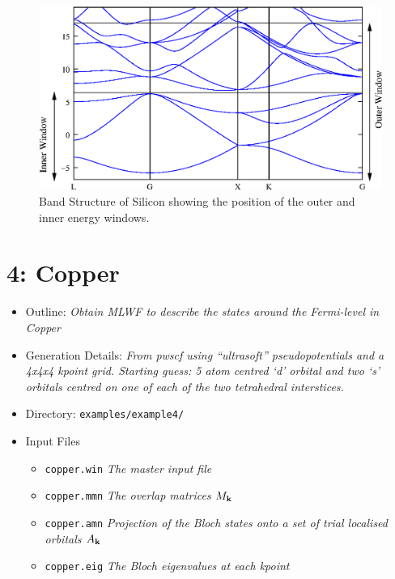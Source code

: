\documentclass[a4paper,11pt,twoside]{article}
\begin{document}
\begin{figure}[h]
\begin{center}
\includegraphics{si.eps}
\caption{Band Structure of Silicon showing the position of the outer and inner energy windows.}
\label{fig:si.bnd}
\end{center}
\end{figure}

\cleardoublepage


\section*{4: Copper}

\begin{itemize}
\item{Outline: \it{Obtain MLWF to describe the states around the Fermi-level in Copper}}
\item{Generation Details: \it{From pwscf using ``ultrasoft'' pseudopotentials
and a 4x4x4 kpoint grid. Starting guess: 5 atom centred `d' orbital and two `s' orbitals centred on 
one of each of the two tetrahedral interstices.}}
\item{Directory: {\tt examples/example4/}}
\item{Input Files}
\begin{itemize}
\item{ {\tt copper.win}  {\it The master input file}}
\item{ {\tt copper.mmn}  {\it The overlap matrices $M_{{\bf k}}$}}
\item{ {\tt copper.amn}  {\it Projection of the Bloch states onto a set of trial localised orbitals $A_{{\bf k}}$}}
\item{ {\tt copper.eig}  {\it The Bloch eigenvalues at each kpoint}}
\end{itemize}

\end{itemize}
\end{document}
